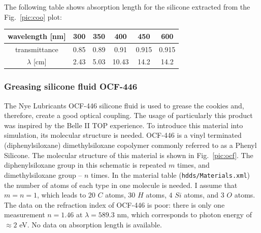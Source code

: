 The following table shows absorption length for the silicone extracted from the Fig.~\ref{pic:coo} plot:


\begin{center}
\begin{tabular}{| c | c | c | c | c | c|}
\hline
wavelength [nm] & 300 & 350 & 400 & 450 & 600 \\
\hline
transmittance & 0.85 & 0.89 & 0.91 & 0.915 & 0.915 \\
\hline
$\lambda$ [cm] & 2.43 & 5.03 & 10.43 & 14.2 & 14.2 \\
\hline
\end{tabular}
\end{center}

\subsubsection*{Greasing silicone fluid OCF-446}

The Nye Lubricants OCF-446 silicone fluid is used to grease the cookies and, therefore, create a good optical coupling. The usage of particularly this product was inspired by the Belle II TOP experience. To introduce this material into simulation, its molecular structure is needed. OCF-446 is a vinyl terminated (diphenylsiloxane) dimethylsiloxane copolymer commonly referred to as a Phenyl Silicone. The molecular structure of this material is shown in Fig.~\ref{pic:ocf}. The diphenylsiloxane group in this schematic is repeated $m$ times, and dimethylsiloxane group -- $n$ times. In the material table (\texttt{hdds/Materials.xml}) the number of atoms of each type in one molecule is needed. I assume that $m = n = 1$, which leads to $20$ $C$ atoms, $30$ $H$ atoms, $4$ $Si$ atoms, and $3$ $O$ atoms. The data on the refraction index of OCF-446 is poor: there is only one measurement $n = 1.46$ at $\lambda = 589.3$ nm, which corresponds to photon energy of $\approx 2$  eV. No data on absorption length is available.


